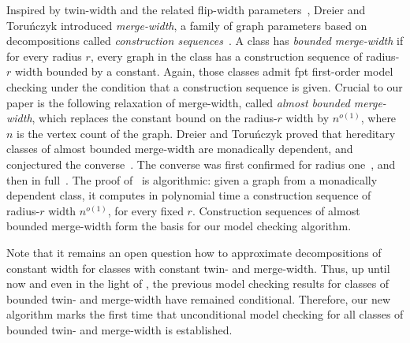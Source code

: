 Inspired by twin-width and the related flip-width parameters~\cite{flip-width},
Dreier and Toru\'nczyk introduced \emph{merge-width}, a family of graph parameters based on decompositions called \emph{construction sequences}~\cite{mw-stoc}.
A class has \emph{bounded merge-width} if for every radius $r$, every graph in the class has a construction sequence of radius-$r$ width bounded by a constant.
Again, those classes admit fpt first-order model checking under the condition that a construction sequence is given.
Crucial to our paper is the following relaxation of merge-width, called \emph{almost bounded merge-width}, which replaces the constant bound on the radius-$r$ width by $n^{o(1)}$, where $n$ is the vertex count of the graph.
Dreier and Toru\'nczyk proved that hereditary classes of almost bounded merge-width are monadically dependent, and conjectured the converse~\cite{mw-stoc}.
The converse was first confirmed for radius one~\cite{neighborhood-complexity-mw}, and then in full~\cite{md-abmw}.
The proof of~\cite{md-abmw} is algorithmic: given a graph from a monadically dependent class, it computes in polynomial time a construction sequence of radius-$r$ width $n^{o(1)}$, for every fixed $r$.
Construction sequences of almost bounded merge-width form the basis for our model checking algorithm.

Note that it remains an open question how to approximate decompositions of constant width for classes with constant twin- and merge-width.
Thus, up until now and even in the light of \cite{md-abmw}, the previous model checking results for classes of bounded twin- and merge-width have remained conditional.
Therefore, our new algorithm marks the first time that unconditional model checking for all classes of bounded twin- and merge-width is established.
